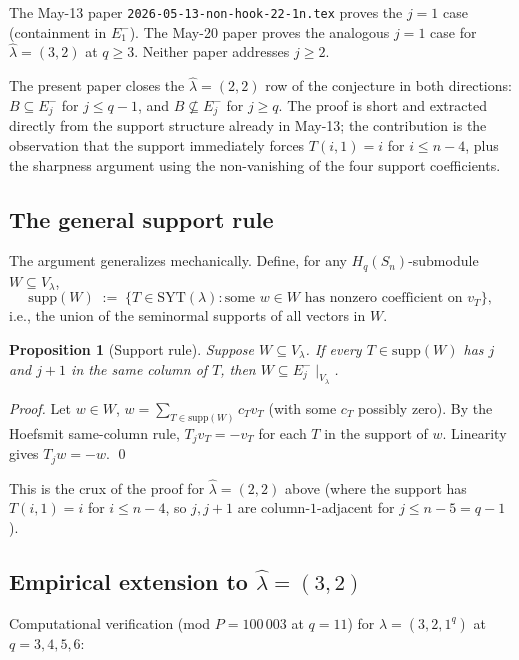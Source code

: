 \documentclass[11pt]{article}
\newtheorem{proposition}[theorem]{Proposition}
\theoremstyle{definition}
\newcommand{\hatl}{\widehat\lambda}
\begin{document}
The May-13 paper \texttt{2026-05-13-non-hook-22-1n.tex} proves the
$j = 1$ case (containment in $E_1^-$).  The May-20 paper proves the
analogous $j = 1$ case for $\hatl = (3,2)$ at $q \ge 3$.  Neither
paper addresses $j \ge 2$.

The present paper closes the $\hatl = (2,2)$ row of the conjecture
in both directions: $B \subseteq E_j^-$ for $j \le q-1$, and
$B \not\subseteq E_j^-$ for $j \ge q$.  The proof is short and
extracted directly from the support structure already in May-13;
the contribution is the observation that the support immediately
forces $T(i,1) = i$ for $i \le n-4$, plus the sharpness argument
using the non-vanishing of the four support coefficients.

\subsection{The general support rule}\label{sec:support-rule}

The argument generalizes mechanically.  Define, for any
$H_q(S_n)$-submodule $W \subseteq V_\lambda$,
\[
   \mathrm{supp}(W) \;:=\; \{ T \in \mathrm{SYT}(\lambda) :
   \text{some } w \in W \text{ has nonzero coefficient on } v_T \},
\]
i.e., the union of the seminormal supports of all vectors in $W$.

\begin{proposition}[Support rule]\label{prop:support-rule}
Suppose $W \subseteq V_\lambda$.  If every $T \in \mathrm{supp}(W)$
has $j$ and $j+1$ in the same column of $T$, then
$W \subseteq E_j^-\mid_{V_\lambda}$.
\end{proposition}

\begin{proof}
Let $w \in W$, $w = \sum_{T \in \mathrm{supp}(W)} c_T v_T$ (with
some $c_T$ possibly zero).  By the Hoefsmit same-column rule,
$T_j v_T = -v_T$ for each $T$ in the support of $w$.  Linearity
gives $T_j w = -w$. \qed
\end{proof}

This is the crux of the proof for $\hatl = (2, 2)$ above (where the
support has $T(i,1) = i$ for $i \le n-4$, so $j, j+1$ are
column-$1$-adjacent for $j \le n - 5 = q - 1$).

\subsection{Empirical extension to $\hatl = (3, 2)$}

Computational verification (mod $P = 100\,003$ at $q = 11$) for
$\lambda = (3, 2, 1^q)$ at $q = 3, 4, 5, 6$:
\end{document}
